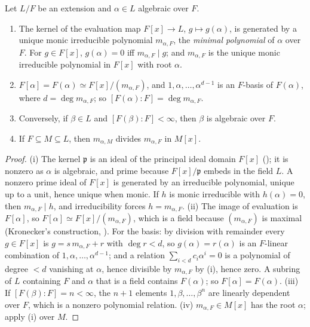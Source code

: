 \begin{proposition}\label{prop:galois:minimal-polynomial}
Let $L/F$ be an extension and $\alpha\in L$ algebraic over $F$.
\begin{enumerate}[label=(\roman*)]
\item The kernel of the evaluation map $F[x]\to L$, $g\mapsto g(\alpha)$, is generated by a unique monic irreducible polynomial $m_{\alpha,F}$, the
\emph{minimal polynomial} of $\alpha$ over $F$. For $g\in F[x]$, $g(\alpha)=0$ iff $m_{\alpha,F}\mid g$; and $m_{\alpha,F}$ is the unique monic irreducible
polynomial in $F[x]$ with root $\alpha$.
\item $F[\alpha]=F(\alpha)\simeq F[x]/(m_{\alpha,F})$, and $1,\alpha,\dots,\alpha^{d-1}$ is an $F$-basis of $F(\alpha)$, where $d=\deg m_{\alpha,F}$; so
$[F(\alpha):F]=\deg m_{\alpha,F}$.
\item Conversely, if $\beta\in L$ and $[F(\beta):F]<\infty$, then $\beta$ is algebraic over $F$.
\item If $F\subseteq M\subseteq L$, then $m_{\alpha,M}$ divides $m_{\alpha,F}$ in $M[x]$.
\end{enumerate}
\end{proposition}

\begin{proof}
(i) The kernel $\mathfrak p$ is an ideal of the principal ideal domain $F[x]$ (); it is nonzero as $\alpha$ is algebraic, and prime because
$F[x]/\mathfrak p$ embeds in the field $L$. A nonzero prime ideal of $F[x]$ is generated by an irreducible polynomial, unique up to a unit, hence unique
when monic. If $h$ is monic irreducible with $h(\alpha)=0$, then $m_{\alpha,F}\mid h$, and irreducibility forces $h=m_{\alpha,F}$.
(ii) The image of evaluation is $F[\alpha]$, so $F[\alpha]\simeq F[x]/(m_{\alpha,F})$, which is a field because $(m_{\alpha,F})$ is maximal (Kronecker's
construction, ). For the basis: by division with remainder every $g\in F[x]$ is $g=s\,m_{\alpha,F}+r$ with $\deg r<d$, so
$g(\alpha)=r(\alpha)$ is an $F$-linear combination of $1,\alpha,\dots,\alpha^{d-1}$; and a relation $\sum_{i<d}c_i\alpha^i=0$ is a polynomial of degree $<d$
vanishing at $\alpha$, hence divisible by $m_{\alpha,F}$ by (i), hence zero. A subring of $L$ containing $F$ and $\alpha$ that is a field contains $F(\alpha)$; so $F[\alpha]=F(\alpha)$.
(iii) If $[F(\beta):F]=n<\infty$, the $n+1$ elements $1,\beta,\dots,\beta^n$ are linearly dependent over $F$, which is a nonzero polynomial relation.
(iv) $m_{\alpha,F}\in M[x]$ has the root $\alpha$; apply (i) over $M$.
\end{proof}


